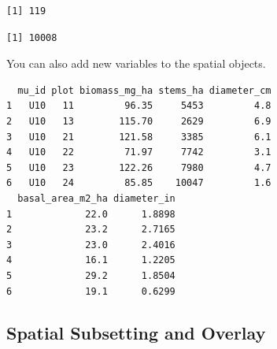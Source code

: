 \documentclass[
]{krantz}
\makeatletter
\newenvironment{Shaded}{\begin{snugshade}}{\end{snugshade}}
\newcommand{\DecValTok}[1]{\textcolor[rgb]{0.06,0.06,0.06}{#1}}
\newcommand{\ErrorTok}[1]{\textcolor[rgb]{0.14,0.14,0.14}{\textbf{#1}}}
\newcommand{\FloatTok}[1]{\textcolor[rgb]{0.06,0.06,0.06}{#1}}
\newcommand{\KeywordTok}[1]{\textcolor[rgb]{0.27,0.27,0.27}{\textbf{#1}}}
\newcommand{\NormalTok}[1]{#1}
\newcommand{\OperatorTok}[1]{\textcolor[rgb]{0.43,0.43,0.43}{\textbf{#1}}}
\newcommand{\StringTok}[1]{\textcolor[rgb]{0.5,0.5,0.5}{#1}}
\newenvironment{kframe}{%
\medskip{}
\setlength{\fboxsep}{.8em}
 \def\at@end@of@kframe{}%
 \ifinner\ifhmode%
  \def\at@end@of@kframe{\end{minipage}}%
  \begin{minipage}{\columnwidth}%
 \fi\fi%
 \def\FrameCommand##1{\hskip\@totalleftmargin \hskip-\fboxsep
 \colorbox{shadecolor}{##1}\hskip-\fboxsep
     \hskip-\linewidth \hskip-\@totalleftmargin \hskip\columnwidth}%
 \MakeFramed {\advance\hsize-\width
   \@totalleftmargin\z@ \linewidth\hsize
   \@setminipage}}%
 {\par\unskip\endMakeFramed%
 \at@end@of@kframe}
\renewenvironment{Shaded}{\begin{kframe}}{\end{kframe}}
\makeatother
\begin{document}
\begin{verbatim}
[1] 119
\end{verbatim}

\begin{Shaded}
\end{Shaded}

\begin{verbatim}
[1] 10008
\end{verbatim}

You can also add new variables to the spatial objects.

\begin{Shaded}
\end{Shaded}

\begin{verbatim}
  mu_id plot biomass_mg_ha stems_ha diameter_cm
1   U10   11         96.35     5453         4.8
2   U10   13        115.70     2629         6.9
3   U10   21        121.58     3385         6.1
4   U10   22         71.97     7742         3.1
5   U10   23        122.26     7980         4.7
6   U10   24         85.85    10047         1.6
  basal_area_m2_ha diameter_in
1             22.0      1.8898
2             23.2      2.7165
3             23.0      2.4016
4             16.1      1.2205
5             29.2      1.8504
6             19.1      0.6299
\end{verbatim}

\hypertarget{spatial-subsetting-and-overlay}{%
\subsection{Spatial Subsetting and Overlay}\label{spatial-subsetting-and-overlay}}
\end{document}
